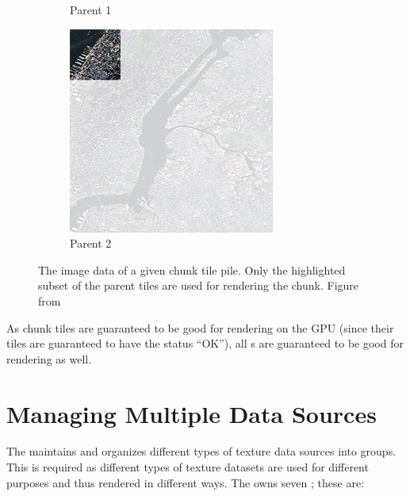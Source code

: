 \begin{figure}[htbp]
\begin{subfigure}[t]{0.3\textwidth}
        \caption{Parent 1}
    \end{subfigure}
    \quad
    \begin{subfigure}[t]{0.3\textwidth}
        \includegraphics[width=\textwidth]{figures/implementation/chunktile/chunktilepile1.png}
        \caption{Parent 2}
    \end{subfigure}
    \caption{The image data of a given chunk tile pile. Only the highlighted subset of the parent tiles are used for rendering the chunk. Figure from \cite{imageryworld2d}}
    \label{fig:chunktilepile}
\end{figure}

As chunk tiles are guaranteed to be good for rendering on the GPU (since their tiles are guaranteed to have the status ``OK''), all s are guaranteed to be good for rendering as well. 

\section{Managing Multiple Data Sources}
The  maintains and organizes different types of texture data sources into groups. This is required as different types of texture datasets are used for different purposes and thus rendered in different ways. The  owns seven ; these are:

